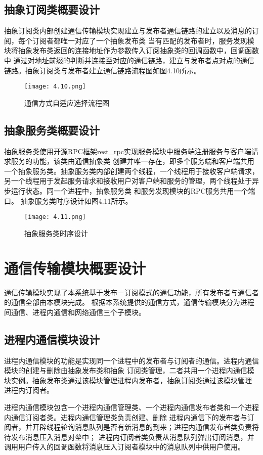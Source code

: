 \subsection{抽象订阅类概要设计}
抽象订阅类内部创建通信传输模块实现建立与发布者通信链路的建立以及消息的订阅，每个订阅者都唯一对应了一个抽象发布类
当有匹配的发布者时，服务发现模块将抽象发布类返回的连接地址作为参数传入订阅抽象类的回调函数中，回调函数中
通过对地址前缀的判断并连接至对应的通信链路，建立与发布者点对点的通信链路。抽象订阅类与发布者建立通信链路流程图如图4.10所示。
\begin{figure}[H]
  \centering
  \texttt{[image: 4.10.png]}
  \caption{通信方式自适应选择流程图}
  \label{fig:39}
\end{figure}

\subsection{抽象服务类概要设计}
抽象服务类使用开源RPC框架rest\_rpc实现服务模块中服务端注册服务与客户端请求服务的功能，该类由通信抽象类
创建并唯一存在，即多个服务端和客户端共用一个抽象服务类。抽象服务类内部创建两个线程，一个线程用于接收客户端请求，
另一个线程用于发起服务请求和接收用户对客户端和服务的管理，两个线程处于异步运行状态。同一个进程中，抽象服务类
和服务发现模块的RPC服务共用一个端口。
抽象服务类时序设计如图4.11所示。
\begin{figure}[H]
  \centering
  \texttt{[image: 4.11.png]}
  \caption{抽象服务类时序设计}
  \label{fig:31}
\end{figure}

\section{通信传输模块概要设计}
通信传输模块实现了本系统基于发布－订阅模式的通信功能，所有发布者与通信者的通信全部由本模块完成。
根据本系统提供的通信方式，通信传输模块分为进程间通信、进程内通信和网络通信三个子模块。

\subsection{进程内通信模块设计}
进程内通信模块的功能是实现同一个进程中的发布者与订阅者的通信。进程内通信模块的创建与删除由抽象发布类和抽象
订阅类管理，二者共用一个进程内通信模块实例。抽象发布类通过该模块管理进程内发布者，抽象订阅类通过该模块管理
进程内订阅者。

进程内通信模块包含一个进程内通信管理类、一个进程内通信发布者类和一个进程内通信订阅者类。进程内通信管理类负责创建、删除
进程内通信下的发布者与订阅者，并开辟线程轮询消息队列是否有新消息的到来；进程内通信发布者类负责将待发布消息压入消息对垒中；
进程内订阅者类负责从消息队列弹出订阅消息，并调用用户传入的回调函数将消息压入订阅者模块中的消息队列中供用户使用。

